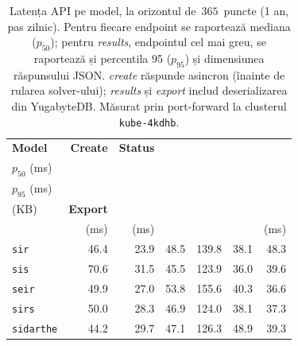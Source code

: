\begin{table}[!htbp]
\centering
\caption[Latența API pe model ($t_{\max}=365$)]{Latența API pe model, la
orizontul de $\,365\,$ puncte (1 an, pas zilnic). Pentru fiecare endpoint se
raportează mediana ($p_{50}$); pentru \emph{results}, endpointul cel mai
greu, se raportează și percentila 95 ($p_{95}$) și dimensiunea răspunsului
JSON. \emph{create} răspunde asincron (înainte de rularea solver-ului);
\emph{results} și \emph{export} includ deserializarea din YugabyteDB.
Măsurat prin port-forward la clusterul \texttt{kube-4kdhb}.}
\label{tab:api_latency}
\footnotesize
\setlength{\tabcolsep}{4pt}
\renewcommand{\arraystretch}{1.1}
\begin{tabular}{l r r r r r r}
\toprule
\textbf{Model} &
  \textbf{Create} &
  \textbf{Status} &
  \makecell[r]{\textbf{Results}\\\scriptsize $p_{50}$ (ms)} &
  \makecell[r]{\textbf{Results}\\\scriptsize $p_{95}$ (ms)} &
  \makecell[r]{\textbf{JSON}\\\scriptsize (KB)} &
  \textbf{Export} \\
 & (ms) & (ms) & & & & (ms) \\
\midrule
\texttt{sir}      & 46.4 & 23.9 & 48.5 & 139.8 & 38.1 & 48.3 \\
\texttt{sis}      & 70.6 & 31.5 & 45.5 & 123.9 & 36.0 & 39.6 \\
\texttt{seir}     & 49.9 & 27.0 & 53.8 & 155.6 & 40.3 & 36.6 \\
\texttt{sirs}     & 50.0 & 28.3 & 46.9 & 124.0 & 38.1 & 37.3 \\
\texttt{sidarthe} & 44.2 & 29.7 & 47.1 & 126.3 & 48.9 & 39.3 \\
\bottomrule
\end{tabular}
\end{table}
